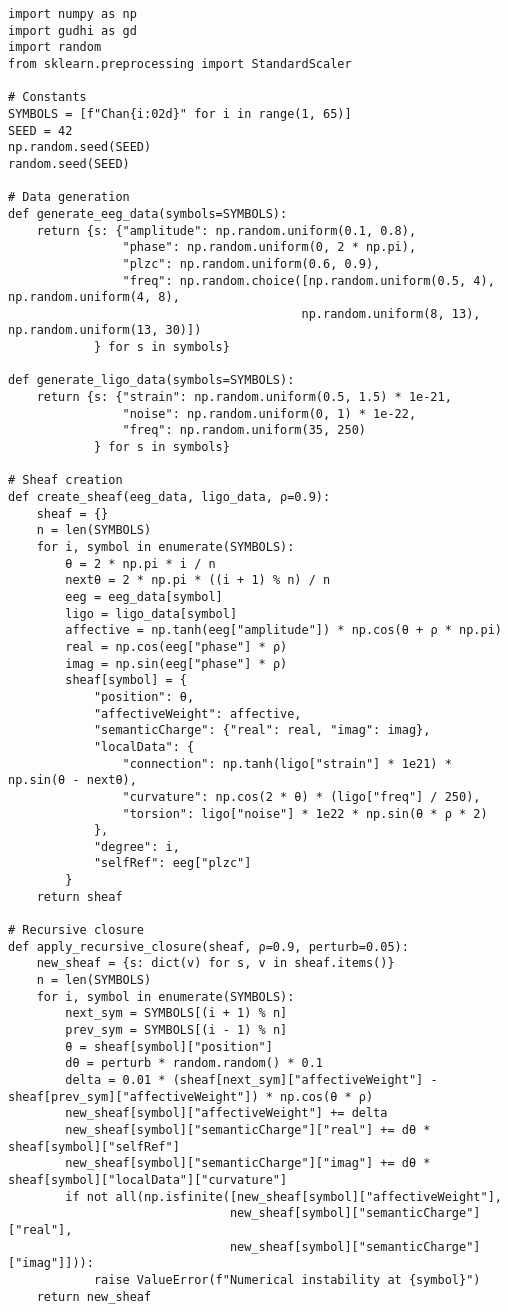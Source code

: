 \documentclass{article}
\begin{document}
\begin{lstlisting}
import numpy as np
import gudhi as gd
import random
from sklearn.preprocessing import StandardScaler

# Constants
SYMBOLS = [f"Chan{i:02d}" for i in range(1, 65)]
SEED = 42
np.random.seed(SEED)
random.seed(SEED)

# Data generation
def generate_eeg_data(symbols=SYMBOLS):
    return {s: {"amplitude": np.random.uniform(0.1, 0.8),
                "phase": np.random.uniform(0, 2 * np.pi),
                "plzc": np.random.uniform(0.6, 0.9),
                "freq": np.random.choice([np.random.uniform(0.5, 4), np.random.uniform(4, 8),
                                         np.random.uniform(8, 13), np.random.uniform(13, 30)])
            } for s in symbols}

def generate_ligo_data(symbols=SYMBOLS):
    return {s: {"strain": np.random.uniform(0.5, 1.5) * 1e-21,
                "noise": np.random.uniform(0, 1) * 1e-22,
                "freq": np.random.uniform(35, 250)
            } for s in symbols}

# Sheaf creation
def create_sheaf(eeg_data, ligo_data, ρ=0.9):
    sheaf = {}
    n = len(SYMBOLS)
    for i, symbol in enumerate(SYMBOLS):
        θ = 2 * np.pi * i / n
        nextθ = 2 * np.pi * ((i + 1) % n) / n
        eeg = eeg_data[symbol]
        ligo = ligo_data[symbol]
        affective = np.tanh(eeg["amplitude"]) * np.cos(θ + ρ * np.pi)
        real = np.cos(eeg["phase"] * ρ)
        imag = np.sin(eeg["phase"] * ρ)
        sheaf[symbol] = {
            "position": θ,
            "affectiveWeight": affective,
            "semanticCharge": {"real": real, "imag": imag},
            "localData": {
                "connection": np.tanh(ligo["strain"] * 1e21) * np.sin(θ - nextθ),
                "curvature": np.cos(2 * θ) * (ligo["freq"] / 250),
                "torsion": ligo["noise"] * 1e22 * np.sin(θ * ρ * 2)
            },
            "degree": i,
            "selfRef": eeg["plzc"]
        }
    return sheaf

# Recursive closure
def apply_recursive_closure(sheaf, ρ=0.9, perturb=0.05):
    new_sheaf = {s: dict(v) for s, v in sheaf.items()}
    n = len(SYMBOLS)
    for i, symbol in enumerate(SYMBOLS):
        next_sym = SYMBOLS[(i + 1) % n]
        prev_sym = SYMBOLS[(i - 1) % n]
        θ = sheaf[symbol]["position"]
        dθ = perturb * random.random() * 0.1
        delta = 0.01 * (sheaf[next_sym]["affectiveWeight"] - sheaf[prev_sym]["affectiveWeight"]) * np.cos(θ * ρ)
        new_sheaf[symbol]["affectiveWeight"] += delta
        new_sheaf[symbol]["semanticCharge"]["real"] += dθ * sheaf[symbol]["selfRef"]
        new_sheaf[symbol]["semanticCharge"]["imag"] += dθ * sheaf[symbol]["localData"]["curvature"]
        if not all(np.isfinite([new_sheaf[symbol]["affectiveWeight"],
                               new_sheaf[symbol]["semanticCharge"]["real"],
                               new_sheaf[symbol]["semanticCharge"]["imag"]])):
            raise ValueError(f"Numerical instability at {symbol}")
    return new_sheaf


\end{lstlisting}
\end{document}
